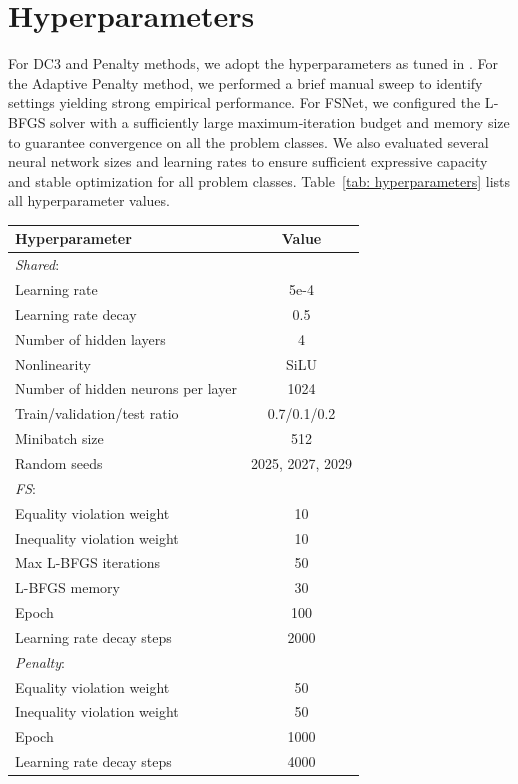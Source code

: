 \documentclass{article}
\newcommand{\e}[1]{e{#1}}
\begin{document}
\section{Hyperparameters} \label{appendix: hyperparameters}
For DC3 and Penalty methods, we adopt the hyperparameters as tuned in \cite{donti2021dc3}. 
For the Adaptive Penalty method, we performed a brief manual sweep to identify settings yielding strong empirical performance. For FSNet, we configured the L‐BFGS solver with a sufficiently large maximum‐iteration budget and memory size to guarantee convergence on all the problem classes. We also evaluated several neural network sizes and learning rates to ensure sufficient expressive capacity and stable optimization for all problem classes.
Table~\ref{tab: hyperparameters} lists all hyperparameter values.

\begin{table}[ht]
\centering
\footnotesize
\setlength{\tabcolsep}{6pt}
\begin{tabular}{l|c}
\toprule
Hyperparameter & Value \\
\midrule
\hspace{-8pt} \textit{Shared}: & \\
Learning rate & 5\e{-4} \\
Learning rate decay & 0.5 \\
Number of hidden layers & 4 \\
Nonlinearity & SiLU \\
Number of hidden neurons per layer & 1024 \\
Train/validation/test ratio & 0.7/0.1/0.2\\
Minibatch size & 512 \\
Random seeds & 2025, 2027, 2029 \\
\midrule
\hspace{-8pt} \textit{FS}: & \\
Equality violation weight & 10 \\
Inequality violation weight & 10 \\
Max L-BFGS iterations & 50 \\
L-BFGS memory & 30 \\
Epoch & 100 \\
Learning rate decay steps & 2000\\

\midrule
\hspace{-8pt} \textit{Penalty}: & \\
Equality violation weight & 50  \\
Inequality violation weight & 50 \\
Epoch & 1000 \\
Learning rate decay steps & 4000\\


\end{tabular}
\end{table}
\end{document}
